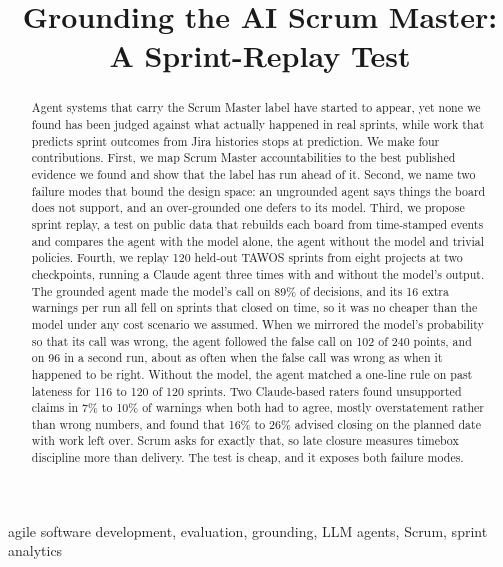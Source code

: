 \documentclass[conference]{IEEEtran}
\begin{document}
\title{Grounding the AI Scrum Master:\\ A Sprint-Replay Test}
\author{
}
\maketitle

\begin{abstract}
Agent systems that carry the Scrum Master label have started to appear, yet none we found has been judged against what actually happened in real sprints, while work that predicts sprint outcomes from Jira histories stops at prediction. We make four contributions. First, we map Scrum Master accountabilities to the best published evidence we found and show that the label has run ahead of it. Second, we name two failure modes that bound the design space: an ungrounded agent says things the board does not support, and an over-grounded one defers to its model. Third, we propose sprint replay, a test on public data that rebuilds each board from time-stamped events and compares the agent with the model alone, the agent without the model and trivial policies. Fourth, we replay 120 held-out TAWOS sprints from eight projects at two checkpoints, running a Claude agent three times with and without the model's output. The grounded agent made the model's call on 89\% of decisions, and its 16 extra warnings per run all fell on sprints that closed on time, so it was no cheaper than the model under any cost scenario we assumed. When we mirrored the model's probability so that its call was wrong, the agent followed the false call on 102 of 240 points, and on 96 in a second run, about as often when the false call was wrong as when it happened to be right. Without the model, the agent matched a one-line rule on past lateness for 116 to 120 of 120 sprints. Two Claude-based raters found unsupported claims in 7\% to 10\% of warnings when both had to agree, mostly overstatement rather than wrong numbers, and found that 16\% to 26\% advised closing on the planned date with work left over. Scrum asks for exactly that, so late closure measures timebox discipline more than delivery. The test is cheap, and it exposes both failure modes.
\end{abstract}

\begin{IEEEkeywords}
agile software development, evaluation, grounding, LLM agents, Scrum, sprint analytics
\end{IEEEkeywords}
\end{document}
